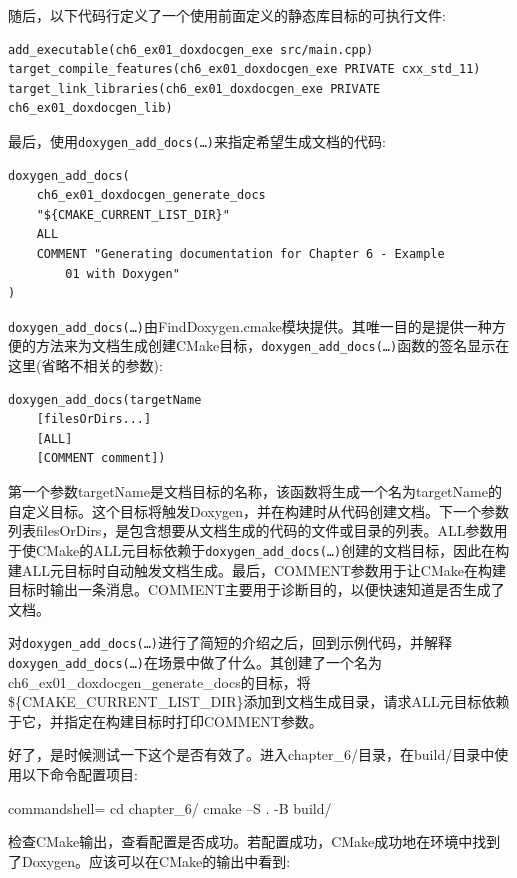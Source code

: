 随后，以下代码行定义了一个使用前面定义的静态库目标的可执行文件:

\begin{lstlisting}[style=styleCMake]
add_executable(ch6_ex01_doxdocgen_exe src/main.cpp)
target_compile_features(ch6_ex01_doxdocgen_exe PRIVATE cxx_std_11)
target_link_libraries(ch6_ex01_doxdocgen_exe PRIVATE ch6_ex01_doxdocgen_lib)
\end{lstlisting}

最后，使用\texttt{doxygen\_add\_docs(…)}来指定希望生成文档的代码:

\begin{lstlisting}[style=styleCMake]
doxygen_add_docs(
	ch6_ex01_doxdocgen_generate_docs
	"${CMAKE_CURRENT_LIST_DIR}"
	ALL
	COMMENT "Generating documentation for Chapter 6 - Example
		01 with Doxygen"
)
\end{lstlisting}
 
\texttt{doxygen\_add\_docs(…)}由FindDoxygen.cmake模块提供。其唯一目的是提供一种方便的方法来为文档生成创建CMake目标，\texttt{doxygen\_add\_docs(…)}函数的签名显示在这里(省略不相关的参数):

\begin{lstlisting}[style=styleCMake]
doxygen_add_docs(targetName
	[filesOrDirs...]
	[ALL]
	[COMMENT comment])
\end{lstlisting}

第一个参数targetName是文档目标的名称，该函数将生成一个名为targetName的自定义目标。这个目标将触发Doxygen，并在构建时从代码创建文档。下一个参数列表filesOrDirs，是包含想要从文档生成的代码的文件或目录的列表。ALL参数用于使CMake的ALL元目标依赖于\texttt{doxygen\_add\_docs(…)}创建的文档目标，因此在构建ALL元目标时自动触发文档生成。最后，COMMENT参数用于让CMake在构建目标时输出一条消息。COMMENT主要用于诊断目的，以便快速知道是否生成了文档。

对\texttt{doxygen\_add\_docs(…)}进行了简短的介绍之后，回到示例代码，并解释\texttt{doxygen\_add\_docs(…)}在场景中做了什么。其创建了一个名为ch6\_ex01\_doxdocgen\_generate\_docs的目标，将\$\{CMAKE\_CURRENT\_LIST\_DIR\}添加到文档生成目录，请求ALL元目标依赖于它，并指定在构建目标时打印COMMENT参数。

好了，是时候测试一下这个是否有效了。进入chapter\_6/目录，在build/目录中使用以下命令配置项目:

\begin{tcblisting}{commandshell={}}
cd chapter_6/
cmake –S . -B build/
\end{tcblisting}

检查CMake输出，查看配置是否成功。若配置成功，CMake成功地在环境中找到了Doxygen。应该可以在CMake的输出中看到:

